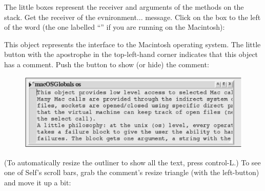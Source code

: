 \documentclass[letterpaper,10pt,english]{sphinxmanual}
\begin{document}
The little boxes represent the receiver and arguments of the methods on the stack. Get the receiver
of the evnironment... message. Click on the box to the left of the word 
(the one labelled “” if you are running on the Macintosh):
\begin{figure}[htbp]\begin{flushleft}

\end{flushleft}\end{figure}

This object represents the interface to the Macintosh operating system. The little button with the
apostrophe in the top-left-hand corner indicates that this object has a comment. Push the button to
show (or hide) the comment:
\begin{figure}[htbp]\begin{flushleft}

\includegraphics{Pgm_Env_Image22.png}
\end{flushleft}\end{figure}

(To automatically resize the outliner to show all the text, press control-L.) To see one of Self’s
scroll bars, grab the comment’s resize triangle (with the left-button) and move it up a bit:
\begin{figure}[htbp]\begin{flushleft}

\end{flushleft}\end{figure}
\end{document}
